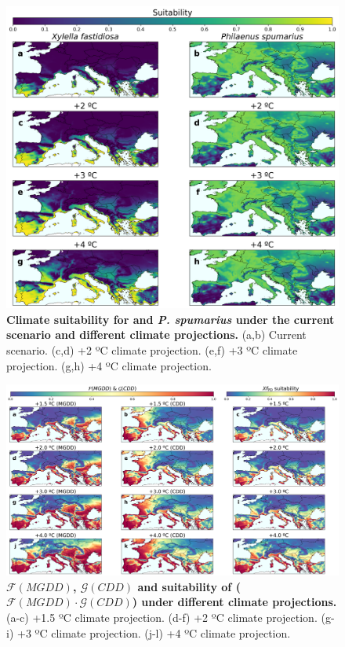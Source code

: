 \begin{figure}[H]
    \centering
    \includegraphics[width=\textwidth]{Figures/Xf_Ps_suitability.pdf}
    \caption[Climate suitability for \xf{} and \textit{P.
            spumarius} under present and future climate
        conditions.]{\textbf{Climate suitability for \xf{} and \textit{P.
                spumarius} under the current scenario and different climate
            projections.} (a,b)
        Current scenario. (c,d) +2 ºC climate projection. (e,f) +3 ºC climate
        projection. (g,h) +4 ºC climate projection.}
    \label{fig:Xf_Ps_suitability}
\end{figure}

\begin{figure}[H]
    \centering

    \includegraphics[width=\textwidth]{Figures/Xf_suitability_explainability.pdf}
    \caption[$\mathcal{F}(MGDD)$, $\mathcal{G}(CDD)$ and
        suitability of \xf{} under different climate
        projections]{\textbf{$\mathcal{F}(MGDD)$,
            $\mathcal{G}(CDD)$ and
            suitability of \xf{} ($\mathcal{F}(MGDD)\cdot\mathcal{G}(CDD)$)
            under different
            climate projections.} (a-c) +1.5 ºC climate projection. (d-f) +2 ºC
        climate
        projection. (g-i) +3 ºC climate projection. (j-l) +4 ºC climate
        projection.}
    \label{fig:Xf_suitability_explainability}
\end{figure}

